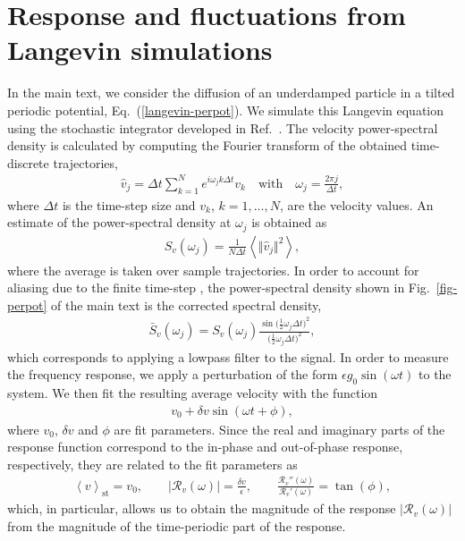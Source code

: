 \documentclass[aps,pre,twocolumn,superscriptaddress,notitlepage]{revtex4-2}
\newcommand{\Av}[1]{\left\langle #1 \right\rangle}
\newcommand{\bmc}[1]{\bm{\mathcal{#1}}}
\renewcommand{\eqref}[1]{Eq.~(\ref{#1})}
\begin{document}
\section{Response and fluctuations from Langevin simulations}
In the main text, we consider the diffusion of an underdamped particle in a tilted periodic potential, \eqref{langevin-perpot}.
We simulate this Langevin equation using the stochastic integrator developed in Ref.~\cite{Bussi2007}.
The velocity power-spectral density is calculated by computing the Fourier transform of the obtained time-discrete trajectories,
\begin{align}
\hat{v}_j = \Delta t \sum_{k = 1}^{N} e^{i \omega_j k \Delta t} v_k \quad \text{with} \quad \omega_j = \frac{2 \pi j}{\Delta t},
\end{align}
where $\Delta t$ is the time-step size and $v_k$, $k = 1,\ldots,N$, are the velocity values.
An estimate of the power-spectral density at $\omega_j$ is obtained as
\begin{align}
S_v(\omega_j) = \frac{1}{N \Delta t} \Av{\Vert \hat{v}_j \Vert^2},
\end{align}
where the average is taken over sample trajectories.
In order to account for aliasing due to the finite time-step \cite{Smith1999}, the power-spectral density shown in Fig.~\ref{fig-perpot} of the main text is the corrected spectral density,
\begin{align}
\bar{S}_v(\omega_j) = S_v(\omega_j) \frac{\sin\big(\frac{1}{2} \omega_j \Delta t\big)^2}{\big(\frac{1}{2} \omega_j \Delta t\big)^2 },
\end{align}
which corresponds to applying a lowpass filter to the signal.
In order to measure the frequency response, we apply a perturbation of the form $\epsilon g_0 \sin(\omega t)$ to the system.
We then fit the resulting average velocity with the function
\begin{align}
v_0 + \delta v \sin(\omega t + \phi) ,
\end{align}
where $v_0$, $\delta v$ and $\phi$ are fit parameters.
Since the real and imaginary parts of the response function correspond to the in-phase and out-of-phase response, respectively, they are related to the fit parameters as
\begin{align}
\Av{v}_\text{st} = v_0, \qquad \vert \bmc{R}_v(\omega) \vert = \frac{\delta v}{\epsilon}, \qquad \frac{\bmc{R}_v''(\omega)}{\bmc{R}_v'(\omega)} = \tan(\phi) ,
\end{align}
which, in particular, allows us to obtain the magnitude of the response $\vert \bmc{R}_v(\omega) \vert$ from the magnitude of the time-periodic part of the response.


\end{document}
